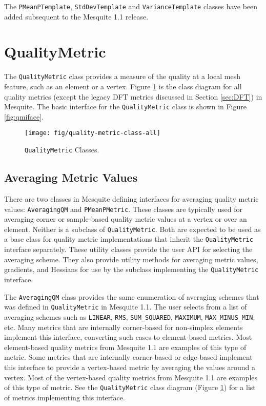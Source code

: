 \documentclass{article}
\begin{document}
The \texttt{PMeanPTemplate}, \texttt{StdDevTemplate} and \texttt{VarianceTemplate} classes have been added subsequent to the Mesquite 1.1 release.


\section{QualityMetric}

The \texttt{QualityMetric} class provides a measure of the quality at a local mesh feature, such as an element or a vertex.  Figure \ref{fig:qmclass} is the class diagram for all quality metrics (except the legacy DFT metrics discussed in Section \ref{sec:DFT}) in Mesquite.  The basic interface for the \texttt{QualityMetric} class is shown in Figure \ref{fig:qmiface}.


\begin{figure}[p]
\begin{smallmargins}
\texttt{[image: fig/quality-metric-class-all]}
\caption{\texttt{QualityMetric} Classes.\label{fig:qmclass}}
\end{smallmargins}
\end{figure}


\subsection{Averaging Metric Values}

\label{sec:qmaverage}

There are two classes in Mesquite defining interfaces for averaging quality metric values: \texttt{AveragingQM} and \texttt{PMeanPMetric}.  These classes are typically used for averaging corner or sample-based quality metric values at a vertex or over an element.  Neither is a subclass of \texttt{QualityMetric}.  Both are expected to be used as a base class for quality metric implementations that inherit the \texttt{QualityMetric} interface separately.  These utility classes provide the user API for selecting the averaging scheme.  They also provide utility methods for averaging metric values, gradients, and Hessians for use by the subclass implementing the \texttt{QualityMetric} interface.

The \texttt{AveragingQM} class provides the same enumeration of averaging schemes that was defined in \texttt{QualityMetric} in Mesquite 1.1.  The user selects from a list of averaging schemes such as \texttt{LINEAR}, \texttt{RMS}, \texttt{SUM\_SQUARED}, \texttt{MAXIMUM}, \texttt{MAX\_MINUS\_MIN}, etc.  Many metrics that are internally corner-based for non-simplex elements implement this interface, converting such cases to element-based metrics.  Most element-based quality metrics from Mesquite 1.1 are examples of this type of metric.  Some metrics that are internally corner-based or edge-based implement this interface to provide a vertex-based metric by averaging the values around a vertex.  Most of the vertex-based quality metrics from Mesquite 1.1 are examples of this type of metric.  See the \texttt{QualityMetric} class diagram (Figure \ref{fig:qmclass}) for a list of metrics implementing this interface.
\end{document}
